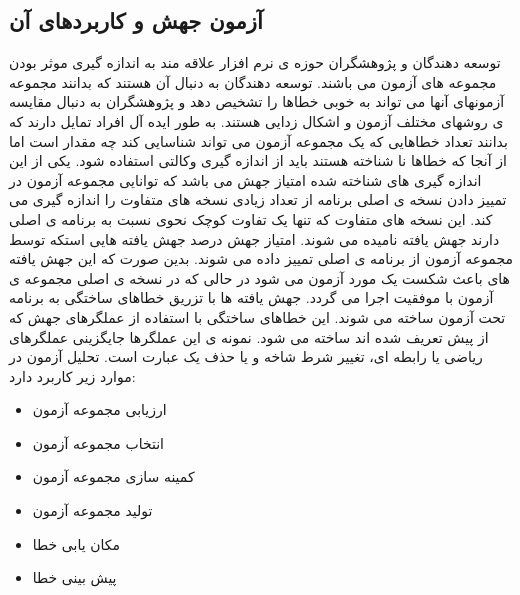 \subsection{آزمون جهش و کاربردهای آن}
توسعه دهندگان و پژوهشگران حوزه ی نرم افزار علاقه مند به اندازه گیری موثر بودن مجموعه های آزمون می باشند. توسعه دهندگان به دنبال آن هستند که بدانند مجموعه آزمونهای آنها می تواند به خوبی خطاها را تشخیص دهد و پژوهشگران به دنبال مقایسه ی روشهای مختلف آزمون و اشکال زدایی  هستند. به طور ایده آل افراد تمایل دارند که بدانند تعداد خطاهایی که یک مجموعه آزمون می تواند شناسایی کند چه مقدار است اما از آنجا که خطاها نا شناخته هستند باید از اندازه گیری وکالتی  استفاده شود. یکی از این اندازه گیری های شناخته شده امتیاز جهش  می باشد که توانایی مجموعه آزمون در تمییز دادن نسخه ی اصلی برنامه از تعداد زیادی نسخه های متفاوت را اندازه گیری می کند. این نسخه های متفاوت که تنها یک تفاوت کوچک نحوی نسبت به برنامه ی اصلی دارند جهش یافته  نامیده می شوند. امتیاز جهش درصد جهش یافته هایی  استکه توسط مجموعه آزمون از برنامه ی اصلی تمییز داده می شوند. بدین صورت که این جهش یافته های باعث شکست یک مورد آزمون می شود در حالی که در نسخه ی اصلی مجموعه ی آزمون با موفقیت اجرا می گردد. جهش یافته ها با تزریق خطاهای ساختگی به برنامه تحت آزمون  ساخته می شوند. این خطاهای ساختگی با استفاده از عملگرهای جهش که از پیش تعریف شده اند ساخته می شود. نمونه ی این عملگرها جایگزینی عملگرهای ریاضی یا رابطه ای، تغییر شرط شاخه  و یا حذف یک عبارت است\cite{just2014mutants}. تحلیل آزمون در موارد زیر کاربرد دارد:
\begin{itemize}
	\setlength\itemsep{.2cm}	
	\item 
	ارزیابی مجموعه آزمون
	\item 
	انتخاب مجموعه آزمون
	\item 
	 کمینه سازی مجموعه آزمون
	\item 
	 تولید مجموعه آزمون
	\item 
	مکان یابی خطا
	\item 
	پیش بینی خطا
\end{itemize}


